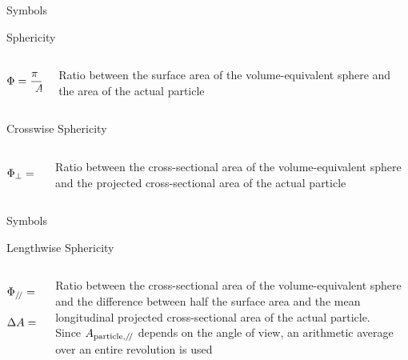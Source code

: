 \documentclass[11pt]{beamer}
\begin{document}
	\begin{frame}{Symbols}
		\begin{block}{Sphericity}
			\begin{columns}[T]
				\begin{column}{.4\textwidth}
					\begin{equation*}
						\Phi = \dfrac{\pi \ d_{\textup{v}}^2} {A_{\textup{p}}}
					\end{equation*}
				\end{column}
			
				\begin{column}{.6\textwidth}
					Ratio between the surface area of the volume-equivalent sphere and the area of the actual particle
				\end{column}
			\end{columns}
		\end{block}
		\vfill
		\begin{block}{Crosswise Sphericity}
			\begin{columns}[T]
				\begin{column}{.4\textwidth}
					\begin{equation*}
					\Phi_{\perp} = \dfrac{\frac{\pi}{4}\ d_{\textup{v}}^2} {A_{\textup{p}, \perp}}
					\end{equation*}
				\end{column}
				
				\begin{column}{.6\textwidth}
					Ratio between the cross-sectional area of the volume-equivalent sphere and the projected cross-sectional area of the actual particle
				\end{column}
			\end{columns}
		\end{block}
	\end{frame}

	\begin{frame}{Symbols}
		\begin{block}{Lengthwise Sphericity}
			\begin{columns}[T]
				\begin{column}{.4\textwidth}
					\begin{equation*}
					\Phi_{/\!/} = \dfrac{\frac{\pi}{4}\ d_{\textup{v}}^2} {\Delta A}
					\end{equation*}	
					\vfill		
					\begin{equation*}
					\Delta A = \dfrac{A_{\textup{p}}}{2} - \bar{A_{\textup{p},/\!/}}
					\end{equation*}
				\end{column}
				
				\begin{column}{.6\textwidth}
					Ratio between the cross-sectional area of the volume-equivalent sphere and the difference between half the surface area and the mean longitudinal projected cross-sectional area of the actual particle.\\
					Since $ A_{\textup{particle},/\!/} $ depends on the angle of view, an arithmetic average over an entire revolution is used
				\end{column}
			\end{columns}
		\end{block}
	\end{frame}
\end{document}
